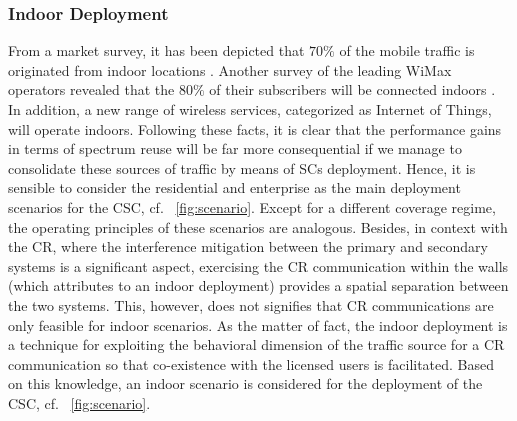 \subsubsection*{Indoor Deployment}
From a market survey, it has been depicted that $70\%$ of the mobile traffic is originated from indoor locations \cite{Chander08}. Another survey of the leading WiMax operators revealed that the $80\%$ of their subscribers will be connected indoors \cite{Pao07}. In addition, a new range of wireless services, categorized as Internet of Things, will operate indoors. Following these facts, it is clear that the performance gains in terms of spectrum reuse will be far more consequential if we manage to consolidate these sources of traffic by means of SCs deployment. Hence, it is sensible to consider the residential and enterprise as the main deployment scenarios for the CSC, cf. \figurename~\ref{fig:scenario}. Except for a different coverage regime, the operating principles of these scenarios are analogous. Besides, in context with the CR, where the interference mitigation between the primary and secondary systems is a significant aspect, exercising the CR communication within the walls (which attributes to an indoor deployment) provides a spatial separation between the two systems. This, however, does not signifies that CR communications are only feasible for indoor scenarios. As the matter of fact, the indoor deployment is a technique for exploiting the behavioral dimension of the traffic source for a CR communication so that co-existence with the licensed users is facilitated. 
Based on this knowledge, an indoor scenario is considered for the deployment of the CSC, cf. \figurename~\ref{fig:scenario}.  


